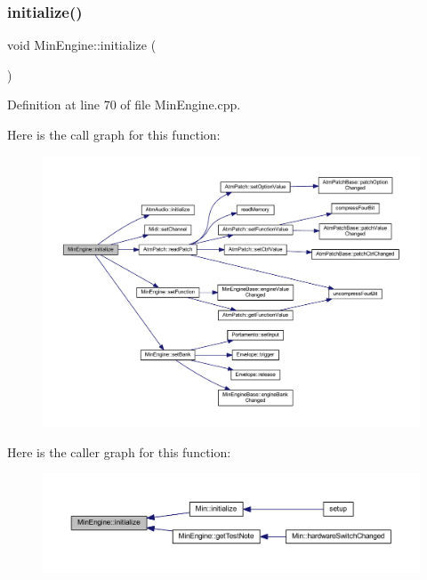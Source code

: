 \subsubsection{\texorpdfstring{initialize()}{initialize()}}
{\footnotesize\ttfamily void Min\+Engine\+::initialize (\begin{DoxyParamCaption}{ }\end{DoxyParamCaption})}



Definition at line 70 of file Min\+Engine.\+cpp.

Here is the call graph for this function\+:
\nopagebreak
\begin{figure}[H]
\begin{center}
\leavevmode
\includegraphics[width=350pt]{class_min_engine_ae59276976966cfd710288c1bbf1ea0cf_cgraph}
\end{center}
\end{figure}
Here is the caller graph for this function\+:
\nopagebreak
\begin{figure}[H]
\begin{center}
\leavevmode
\includegraphics[width=350pt]{class_min_engine_ae59276976966cfd710288c1bbf1ea0cf_icgraph}
\end{center}
\end{figure}
\mbox{\label{class_min_engine_afd7005953daedf58d4332627e1592c07}} 
